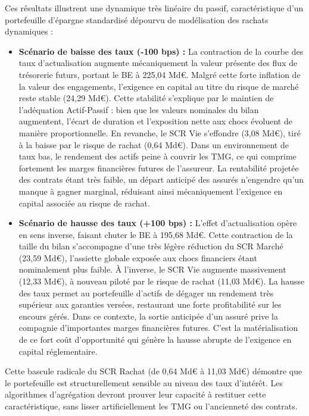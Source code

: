 Ces résultats illustrent une dynamique très linéaire du passif, caractéristique d'un portefeuille d'épargne standardisé dépourvu de modélisation des rachats dynamiques :
\begin{itemize}
    \item \textbf{Scénario de baisse des taux (-100 bps) :} La contraction de la courbe des taux d'actualisation augmente mécaniquement la valeur présente des flux de trésorerie futurs, portant le BE à 225{,}04 Md\euro{}. Malgré cette forte inflation de la valeur des engagements, l'exigence en capital au titre du risque de marché reste stable (24{,}29 Md\euro{}). Cette stabilité s'explique par le maintien de l'adéquation Actif-Passif : bien que les valeurs nominales du bilan augmentent, l'écart de duration et l'exposition nette aux chocs évoluent de manière proportionnelle. En revanche, le SCR Vie s'effondre (3{,}08 Md\euro{}), tiré à la baisse par le risque de rachat (0{,}64 Md\euro{}). Dans un environnement de taux bas, le rendement des actifs peine à couvrir les TMG, ce qui comprime fortement les marges financières futures de l'assureur. La rentabilité projetée des contrats étant très faible, un départ anticipé des assurés n'engendre qu'un manque à gagner marginal, réduisant ainsi mécaniquement l'exigence en capital associée au risque de rachat.
    
    \item \textbf{Scénario de hausse des taux (+100 bps) :} L'effet d'actualisation opère en sens inverse, faisant chuter le BE à 195{,}68 Md\euro{}. Cette contraction de la taille du bilan s'accompagne d'une très légère réduction du SCR Marché (23{,}59 Md\euro{}), l'assiette globale exposée aux chocs financiers étant nominalement plus faible. 
    À l'inverse, le SCR Vie augmente massivement (12{,}33 Md\euro{}), à nouveau piloté par le risque de rachat (11{,}03 Md\euro{}). La hausse des taux permet au portefeuille d'actifs de dégager un rendement très supérieur aux garanties versées, restaurant une forte profitabilité sur les encours gérés. Dans ce contexte, la sortie anticipée d'un assuré prive la compagnie d'importantes marges financières futures. C'est la matérialisation de ce fort coût d'opportunité qui génère la hausse abrupte de l'exigence en capital réglementaire.
\end{itemize}

Cette bascule radicale du SCR Rachat (de 0{,}64 Md\euro{} à 11{,}03 Md\euro{}) démontre que le portefeuille est structurellement sensible au niveau des taux d'intérêt. Les algorithmes d'agrégation devront prouver leur capacité à restituer cette caractéristique, sans lisser artificiellement les TMG ou l'ancienneté des contrats.

